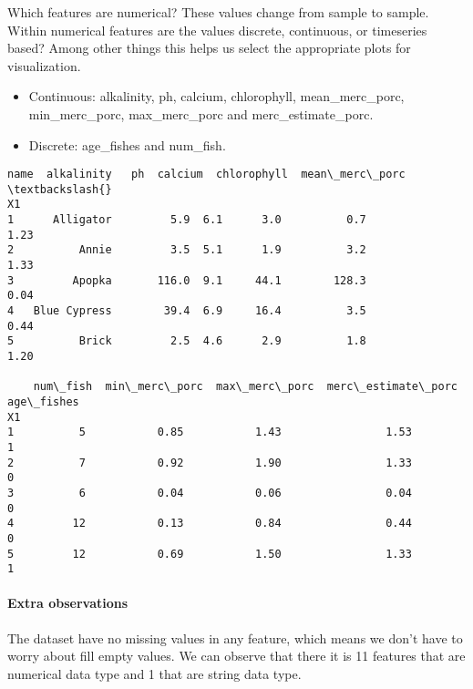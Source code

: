 \documentclass[11pt]{article}
\providecommand{\tightlist}{%
      \setlength{\itemsep}{0pt}\setlength{\parskip}{0pt}}
\begin{document}
Which features are numerical? These values change from sample to sample.
Within numerical features are the values discrete, continuous, or
timeseries based? Among other things this helps us select the
appropriate plots for visualization.

\begin{itemize}
\tightlist
\item
  Continuous: alkalinity, ph, calcium, chlorophyll, mean\_merc\_porc,
  min\_merc\_porc, max\_merc\_porc and merc\_estimate\_porc.
\item
  Discrete: age\_fishes and num\_fish.
\end{itemize}

            \begin{tcolorbox}[breakable, size=fbox, boxrule=.5pt, pad at break*=1mm, opacityfill=0]
\begin{Verbatim}[commandchars=\\\{\}]
            name  alkalinity   ph  calcium  chlorophyll  mean\_merc\_porc  \textbackslash{}
X1
1      Alligator         5.9  6.1      3.0          0.7            1.23
2          Annie         3.5  5.1      1.9          3.2            1.33
3         Apopka       116.0  9.1     44.1        128.3            0.04
4   Blue Cypress        39.4  6.9     16.4          3.5            0.44
5          Brick         2.5  4.6      2.9          1.8            1.20

    num\_fish  min\_merc\_porc  max\_merc\_porc  merc\_estimate\_porc  age\_fishes
X1
1          5           0.85           1.43                1.53           1
2          7           0.92           1.90                1.33           0
3          6           0.04           0.06                0.04           0
4         12           0.13           0.84                0.44           0
5         12           0.69           1.50                1.33           1
\end{Verbatim}
\end{tcolorbox}
        
    \hypertarget{extra-observations}{%
\paragraph{Extra observations}\label{extra-observations}}

The dataset have no missing values in any feature, which means we don't
have to worry about fill empty values. We can observe that there it is
11 features that are numerical data type and 1 that are string data
type.
\end{document}
